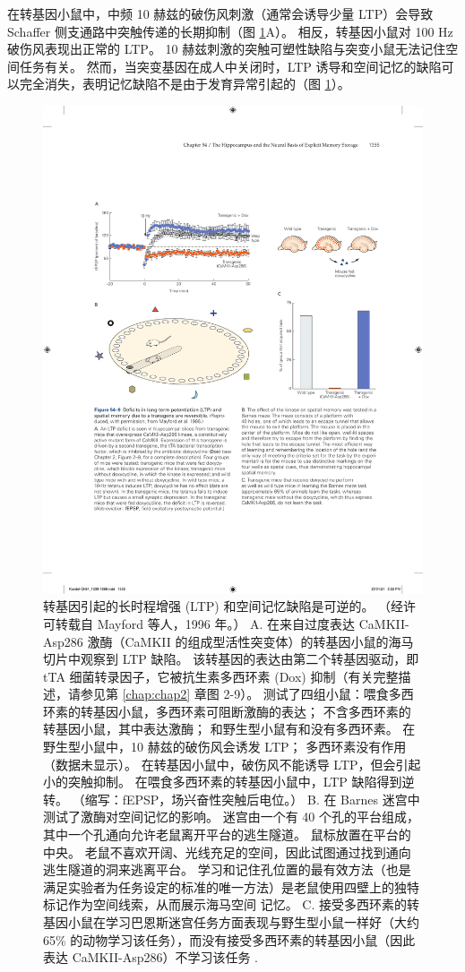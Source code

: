 在转基因小鼠中，中频 10 赫兹的破伤风刺激（通常会诱导少量 LTP）会导致 Schaffer 侧支通路中突触传递的长期抑制（图 \ref{fig:54_9}A）。 相反，转基因小鼠对 100 Hz 破伤风表现出正常的 LTP。 10 赫兹刺激的突触可塑性缺陷与突变小鼠无法记住空间任务有关。 然而，当突变基因在成人中关闭时，LTP 诱导和空间记忆的缺陷可以完全消失，表明记忆缺陷不是由于发育异常引起的（图 \ref{fig:54_9}）。

\begin{figure}[htbp]
	\centering
	\includegraphics[width=0.9\linewidth]{chap54/fig_54_9}
	\caption{转基因引起的长时程增强 (LTP) 和空间记忆缺陷是可逆的。 （经许可转载自 Mayford 等人，1996 年。） A. 在来自过度表达 CaMKII-Asp286 激酶（CaMKII 的组成型活性突变体）的转基因小鼠的海马切片中观察到 LTP 缺陷。 该转基因的表达由第二个转基因驱动，即 tTA 细菌转录因子，它被抗生素多西环素 (Dox) 抑制（有关完整描述，请参见第 \ref{chap:chap2} 章图 2-9）。 测试了四组小鼠：喂食多西环素的转基因小鼠，多西环素可阻断激酶的表达； 不含多西环素的转基因小鼠，其中表达激酶； 和野生型小鼠有和没有多西环素。 在野生型小鼠中，10 赫兹的破伤风会诱发 LTP； 多西环素没有作用（数据未显示）。 在转基因小鼠中，破伤风不能诱导 LTP，但会引起小的突触抑制。 在喂食多西环素的转基因小鼠中，LTP 缺陷得到逆转。 （缩写：fEPSP，场兴奋性突触后电位。） B. 在 Barnes 迷宫中测试了激酶对空间记忆的影响。 迷宫由一个有 40 个孔的平台组成，其中一个孔通向允许老鼠离开平台的逃生隧道。 鼠标放置在平台的中央。 老鼠不喜欢开阔、光线充足的空间，因此试图通过找到通向逃生隧道的洞来逃离平台。 学习和记住孔位置的最有效方法（也是满足实验者为任务设定的标准的唯一方法）是老鼠使用四壁上的独特标记作为空间线索，从而展示海马空间 记忆。 C. 接受多西环素的转基因小鼠在学习巴恩斯迷宫任务方面表现与野生型小鼠一样好（大约 65\% 的动物学习该任务），而没有接受多西环素的转基因小鼠（因此表达 CaMKII-Asp286）不学习该任务 .}
	\label{fig:54_9}
\end{figure}

